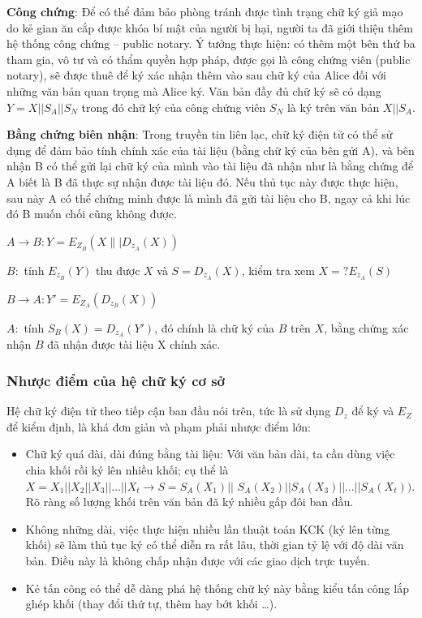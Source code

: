 \documentclass[a4paper,12pt]{report}
\begin{document}
\textbf{Công chứng}: Để có thể đảm bảo phòng tránh được tình trạng chữ ký giả mạo do kẻ gian ăn cắp được khóa bí mật của người bị hại, người ta đã giới thiệu thêm hệ thống công chứng – public notary. Ý tưởng thực hiện: có thêm một bên thứ ba tham gia, vô tư và có thẩm quyền hợp pháp, được gọi là công chứng viên (public notary), sẽ được thuê để ký xác nhận thêm vào sau chữ ký của Alice đối với những văn bản quan trọng mà Alice ký. Văn bản đầy đủ chữ ký sẽ có dạng $Y=X||S_A||S_N$ trong đó chữ ký của công chứng viên $S_N$ là ký trên văn bản $X||S_A$.

\textbf{Bằng chứng biên nhận}: Trong truyền tin liên lạc, chữ ký điện tử có thể sử dụng để đảm bảo tính chính xác của tài liệu (bằng chữ ký của bên gửi A), và bên nhận B có thể gửi lại chữ ký của mình vào tài liệu đã nhận như là bằng chứng để A biết là B đã thực sự nhận được tài liệu đó. Nếu thủ tục này được thực hiện, sau này A có thể chứng minh được là mình đã gửi tài liệu cho B, ngay cả khi lúc đó B muốn chối cũng không được.

$A \rightarrow B: Y = E_{Z_B}(X\||D_{z_A}(X))$

$B:$ tính $E_{z_B}(Y)$ thu được $X$ và $S = D_{z_A}(X)$, kiểm tra xem $X =? E_{z_A}(S)$

$B \rightarrow A: Y' = E_{Z_A}(D_{z_B}(X))$

$A:$ tính $S_B(X) = D_{z_A}(Y')$, đó chính là chữ ký của $B$ trên $X$, bằng chứng xác nhận $B$ đã nhận được tài liệu X chính xác.
\subsubsection{Nhược điểm của hệ chữ ký cơ sở}
Hệ chữ ký điện tử theo tiếp cận ban đầu nói trên, tức là sử dụng $D_z$ để ký và $E_Z$ để kiểm định, là khá đơn giản và phạm phải nhược điểm lớn:
\begin{itemize}
\item Chữ ký quá dài, dài đúng bằng tài liệu: Với văn bản dài, ta cần dùng việc chia khối rồi ký lên nhiều khối; cụ thể là $X = X_1|| X_2|| X_3|| \ldots ||X_t \rightarrow S= S_A(X_1) ||$ $S_A(X_2) || S_A(X_3) || \ldots || S_A(X_t))$. Rõ ràng số lượng khối trên văn bản đã ký nhiều gấp đôi ban đầu.
\item Không những dài, việc thực hiện nhiều lần thuật toán KCK (ký lên từng khối) sẽ làm thủ tục ký có thể diễn ra rất lâu, thời gian tỷ lệ với độ dài văn bản. Điều này là không chấp nhận được với các giao dịch trực tuyến.
\item Kẻ tấn công có thể dễ dàng phá hệ thống chữ ký này bằng kiểu tấn công lắp ghép khối (thay đổi thứ tự, thêm hay bớt khối \ldots).
\end{itemize}
\end{document}
